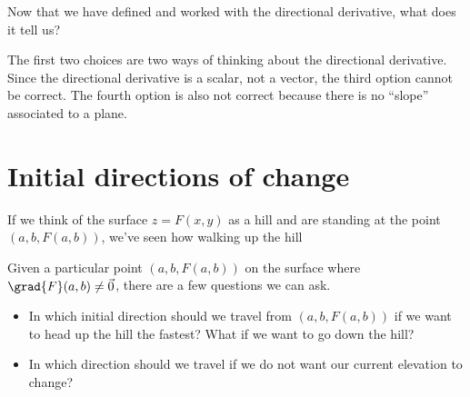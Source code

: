 \documentclass{ximera}
\begin{document}
\begin{example}
\begin{explanation}
\end{explanation}

Now that we have defined and worked with the directional derivative, what does it tell us?
\begin{selectAll}
\end{selectAll}
\begin{feedback}
The first two choices are two ways of thinking about the directional derivative.  Since the directional derivative is a scalar, not a vector, the third option cannot be correct.  The fourth option is also not correct because there is no ``slope'' associated to a plane.
\end{feedback}

\end{example}

%
%

\section{Initial directions of change}
If we think of the surface $z=F(x,y)$ as a hill and are standing at the point $(a,b,F(a,b))$, we've seen how walking up the hill

Given a particular point $(a,b,F(a,b))$ on the surface where $\grad{F}(a,b) \neq \vec{0}$, there are a few questions we can ask.

\begin{itemize}

\item In which initial direction should we travel from $(a,b,F(a,b))$ if we want to head up the hill the fastest? What if we want to go down the hill?

\item In which direction should we travel if we do not want our current elevation to change?

\end{itemize}
\end{document}
